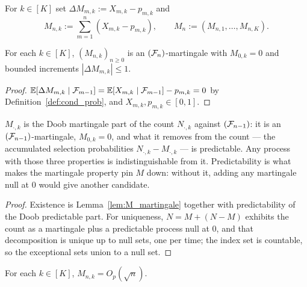\begin{definition}\label{def:M}
\leanok
{}
For $k \in [K]$ set $\Delta M_{m,k} := X_{m,k} - p_{m,k}$ and
\[
  M_{n,k} := \sum_{m=1}^n (X_{m,k} - p_{m,k}), \qquad M_n := (M_{n,1},\dots,M_{n,K}).
\]
\end{definition}

\begin{lemma}[$M$ is a martingale]\label{lem:M_martingale}
\leanok
{}
For each $k \in [K]$, $(M_{n,k})_{n\ge0}$ is an $(\mathcal{F}_n)$-martingale with
$M_{0,k}=0$ and bounded increments $|\Delta M_{m,k}| \le 1$.
\end{lemma}

\begin{proof}\leanok
{}
$\mathbb{E}[\Delta M_{m,k}\mid\mathcal{F}_{m-1}] = \mathbb{E}[X_{m,k}\mid\mathcal{F}_{m-1}] - p_{m,k} = 0$
by Definition~\ref{def:cond_prob}, and $X_{m,k},p_{m,k}\in[0,1]$.
\end{proof}

\begin{lemma}\label{lem:M_unique}
$M_{\cdot,k}$ is the Doob martingale part of the count $N_{\cdot,k}$ against $(\mathcal{F}_{n-1})$: it is
an $(\mathcal{F}_{n-1})$-martingale, $M_{0,k}=0$, and what it removes from the count — the accumulated
selection probabilities $N_{\cdot,k}-M_{\cdot,k}$ — is predictable. Any process with those three
properties is indistinguishable from it. Predictability is what makes the martingale property pin
$M$ down: without it, adding any martingale null at $0$ would give another candidate.
\end{lemma}

\begin{proof}
Existence is Lemma~\ref{lem:M_martingale} together with predictability of the Doob predictable
part. For uniqueness, $N = M + (N-M)$ exhibits the count as a martingale plus a predictable process
null at $0$, and that decomposition is unique up to null sets, one per time; the index set is
countable, so the exceptional sets union to a null set.
\end{proof}

\begin{lemma}\label{lem:M_Op}
\leanok
{}
For each $k \in [K]$, $M_{n,k} = O_p(\sqrt n)$.
\end{lemma}


